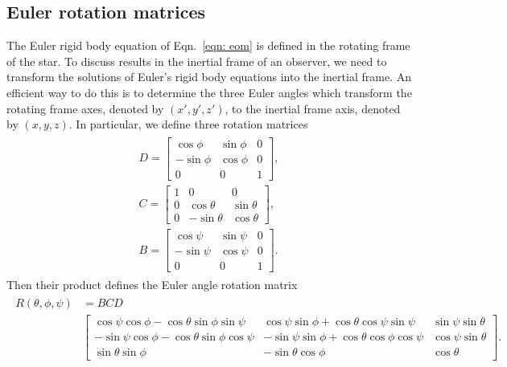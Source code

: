 \documentclass[../full_thesis/full_thesis.tex]{subfiles}
\begin{document}
\subsection{Euler rotation matrices}
\label{sec: euler rotation matrices}
The Euler rigid body equation of Eqn.~\eqref{eqn: eom} is defined in the
rotating frame of the star. To discuss results in the inertial frame of an
observer, we need to transform the solutions of Euler's rigid body equations
into the inertial frame.  An efficient way to do this is to determine the three
Euler angles which transform the rotating frame axes, denoted by $(x',y',
z')$, to the inertial frame axis, denoted by $(x, y, z)$. In particular, we
define three rotation matrices
\begin{align}
\begin{split}
D = \left[\begin{array}{ccc}
\cos\phi & \sin\phi & 0 \\
-\sin\phi & \cos\phi & 0 \\
0 & 0 & 1
\end{array}
\right],
\\
C =
\left[\begin{array}{ccc}
1 & 0 & 0 \\
0 & \cos\theta & \sin\theta \\
0 & -\sin\theta & \cos\theta
\end{array}
\right], \\
B = \left[\begin{array}{ccc}
\cos\psi & \sin\psi & 0 \\
-\sin\psi & \cos\psi & 0 \\
0 & 0 & 1
\end{array}
\right].
\end{split}
\end{align}
Then their product defines the Euler angle rotation matrix
\begin{align}
\begin{split}
R(\theta, \phi, \psi) & = BCD \\
& \left[
\begin{array}{ccc}
\cos\psi \cos\phi - \cos\theta \sin\phi \sin \psi &
\cos\psi \sin \phi + \cos\theta \cos \psi \sin \psi &
\sin \psi \sin\theta \\
-\sin\psi \cos\phi - \cos\theta\sin\phi\cos\psi &
-\sin\psi\sin\phi + \cos\theta\cos\phi\cos\psi &
\cos\psi \sin\theta \\
\sin\theta\sin\phi &
-\sin\theta \cos\phi &
\cos\theta
\end{array}
\right].
\end{split}
\label{eqn: rotation matrix}
\end{align}
\end{document}
